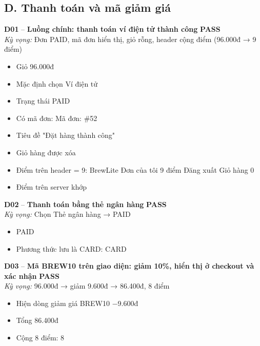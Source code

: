 \documentclass[a4paper,11pt]{article}
\newcommand{\ok}{\textcolor{okgreen}{\textbf{PASS}}}
\begin{document}
\subsection{D. Thanh toán và mã giảm giá}
\begin{minipage}{\textwidth}\vspace{4pt}\textbf{\textcolor{brew}{D01}} -- \textbf{Luồng chính: thanh toán ví điện tử thành công} \hfill \ok\\
{\small\emph{Kỳ vọng:} Đơn PAID, mã đơn hiển thị, giỏ rỗng, header cộng điểm (96.000đ → 9 điểm)}
\end{minipage}
\begin{itemize}\footnotesize
\item \tick Giỏ 96.000đ
\item \tick Mặc định chọn Ví điện tử
\item \tick Trạng thái PAID
\item \tick Có mã đơn: Mã đơn: \#52
\item \tick Tiêu đề "Đặt hàng thành công"
\item \tick Giỏ hàng được xóa
\item \tick Điểm trên header = 9: 
BrewLite
Đơn của tôi
 9 điểm
Đăng xuất
 Giỏ hàng
0
\item \tick Điểm trên server khớp
\end{itemize}
\begin{minipage}{\textwidth}\vspace{4pt}\textbf{\textcolor{brew}{D02}} -- \textbf{Thanh toán bằng thẻ ngân hàng} \hfill \ok\\
{\small\emph{Kỳ vọng:} Chọn Thẻ ngân hàng → PAID}
\end{minipage}
\begin{itemize}\footnotesize
\item \tick PAID
\item \tick Phương thức lưu là CARD: CARD
\end{itemize}
\begin{minipage}{\textwidth}\vspace{4pt}\textbf{\textcolor{brew}{D03}} -- \textbf{Mã BREW10 trên giao diện: giảm 10\%, hiển thị ở checkout và xác nhận} \hfill \ok\\
{\small\emph{Kỳ vọng:} 96.000đ → giảm 9.600đ → 86.400đ, 8 điểm}
\end{minipage}
\begin{itemize}\footnotesize
\item \tick Hiện dòng giảm giá BREW10 −9.600đ
\item \tick Tổng 86.400đ
\item \tick Cộng 8 điểm: 8
\end{itemize}
\end{document}
